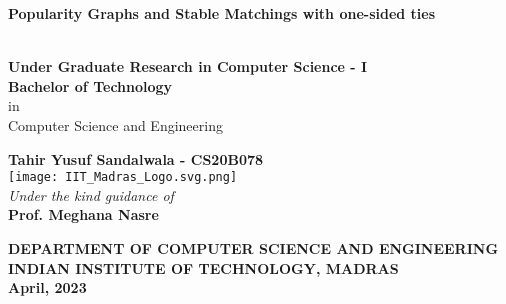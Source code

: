 \documentclass[a4paper,10pt]{article}
\theoremstyle{plain} %
\theoremstyle{plain} %
\begin{document}

\begin{center}
		\begin{huge}			\bf{Popularity Graphs and Stable Matchings with one-sided ties\\}
		\end{huge}
		\vspace*{30pt}
		
		\textbf{\\\Large
			Under Graduate Research in Computer Science - I\\}
		\vspace{20pt}
		\textbf{\Large Bachelor of Technology\\}
		{in}\\
		\vspace{3pt}
		{\Large Computer Science and Engineering}\\
		\vspace{40pt}
		
		\textbf{\Large
			Tahir Yusuf Sandalwala - CS20B078}\\
		\vspace{30pt}
		\texttt{[image: IIT\_Madras\_Logo.svg.png]} \\
		\vspace{30pt}
		\textit{Under the kind guidance of}\\
		\textbf{Prof. Meghana Nasre}\\
		
		
		\vspace{20pt}
		
		
		\textbf{DEPARTMENT OF COMPUTER SCIENCE AND ENGINEERING\\
			INDIAN INSTITUTE OF TECHNOLOGY, MADRAS\\
			April, 2023
		}
	\end{center}


\pagebreak


\tableofcontents

\pagebreak
\end{document}
